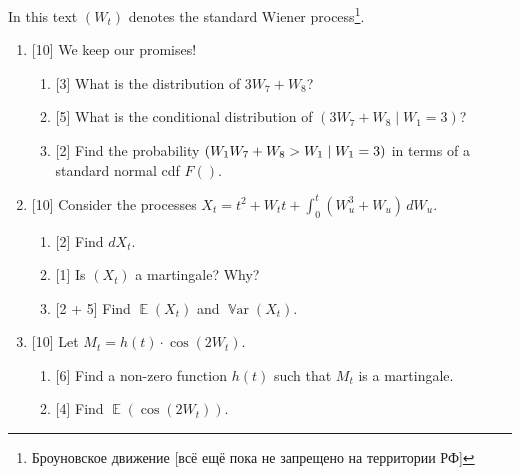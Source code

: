\documentclass[12pt]{article}
\DeclareMathOperator{\Var}{\mathbb{V}ar}
\let\P\relax
\DeclareMathOperator{\P}{\mathbb{P}}
\DeclareMathOperator{\E}{\mathbb{E}}
\begin{document}
In this text $(W_t)$ denotes the standard Wiener process\footnote{Броуновское движение [всё ещё пока не запрещено на территории РФ]}.


\begin{enumerate}
    \item {[10]} We keep our promises! 
    \begin{enumerate}
        \item {[3]} What is the distribution of $3W_7 + W_8$? 
        \item {[5]} What is the conditional distribution of $(3W_7 + W_8 \mid W_1 = 3)$?
        \item {[2]} Find the probability $\P(W_1 W_7 + W_8 > W_1 \mid W_1 = 3)$ in terms of a standard normal cdf $F()$.
    \end{enumerate}


    \item {[10]} Consider the processes $X_t = t^2 +  W_t t + \int_0^t (W_u^3 + W_u) \, dW_u$.
    \begin{enumerate}
        \item {[2]} Find $dX_t$.
        \item {[1]} Is $(X_t)$ a martingale? Why?
        \item {[2 + 5]} Find $\E(X_t)$ and $\Var(X_t)$.
    \end{enumerate}


    \item {[10]} Let $M_t = h(t) \cdot \cos (2W_t)$.
    \begin{enumerate}
        \item {[6]} Find a non-zero function $h(t)$ such that $M_t$ is a martingale.
        \item {[4]} Find $\E(\cos (2W_t))$.
    \end{enumerate}



    

\end{enumerate}
\end{document}
